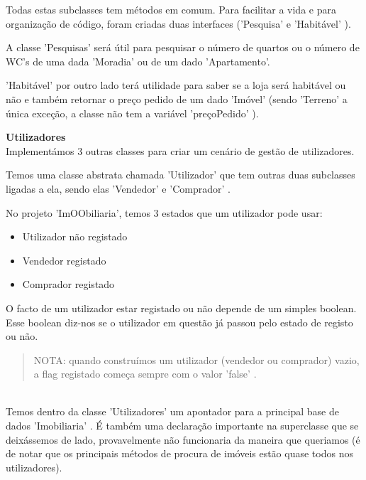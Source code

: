 \documentclass[12pt]{article}
\begin{document}
Todas estas subclasses tem métodos em comum. Para facilitar a vida e para organização de código, foram criadas duas interfaces ('Pesquisa' e 'Habitável' ).
\newline
\newline

A classe 'Pesquisas'  será útil para pesquisar o número de quartos ou o número de WC's de uma dada 'Moradia' ou de um dado 'Apartamento'.
\newline

'Habitável' por outro lado terá utilidade para saber se a loja será habitável ou não e também retornar o preço pedido de um dado 'Imóvel' (sendo 'Terreno' a única exceção, a classe não tem a variável 'preçoPedido' ).    

\pagebreak

\textbf{Utilizadores}
~\\

Implementámos 3 outras classes para criar um cenário de gestão de utilizadores. 
\newline

Temos uma classe abstrata chamada 'Utilizador' que tem outras duas subclasses ligadas a ela, sendo elas 'Vendedor' e 'Comprador' .
\newline

No projeto 'ImOObiliaria', temos 3 estados que um utilizador pode usar:
\newline
\begin{itemize}
\item Utilizador não registado
\item Vendedor registado
\item Comprador registado
\end{itemize}

O facto de um utilizador estar registado ou não depende de um simples boolean.\\ 

Esse boolean diz-nos se o utilizador em questão já passou pelo estado de registo ou não.
~\\
\newline
\begin{quote}
NOTA: quando construímos um utilizador (vendedor ou comprador) vazio, a flag registado começa sempre com o valor 'false' .
\end{quote}

~\\

Temos dentro da classe 'Utilizadores' um apontador para a principal base de dados 'Imobiliaria' . 
É também uma declaração importante na superclasse que se deixássemos de lado, provavelmente não funcionaria da maneira que queriamos (é de notar que os principais métodos de procura de imóveis estão quase todos nos utilizadores).
\newline
\end{document}
